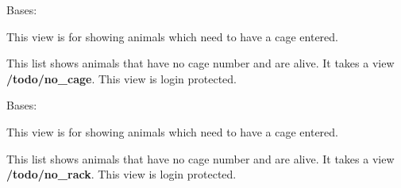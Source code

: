 \documentclass[letterpaper,10pt,english]{sphinxmanual}
\begin{document}
\begin{fulllineitems}
\label{api:mousedb.animal.views.NoCageList}
Bases: {\hyperref[api:mousedb.animal.views.AnimalList]{}}

This view is for showing animals which need to have a cage entered.

This list shows animals that have no cage number and are alive.
It takes a view \textbf{/todo/no\_cage}.
This view is login protected.

\begin{fulllineitems}
\label{api:mousedb.animal.views.NoCageList.queryset}
\end{fulllineitems}


\end{fulllineitems}


\begin{fulllineitems}
\label{api:mousedb.animal.views.NoRackList}
Bases: {\hyperref[api:mousedb.animal.views.AnimalList]{}}

This view is for showing animals which need to have a cage entered.

This list shows animals that have no cage number and are alive.
It takes a view \textbf{/todo/no\_rack}.
This view is login protected.

\begin{fulllineitems}
\label{api:mousedb.animal.views.NoRackList.queryset}
\end{fulllineitems}


\end{fulllineitems}

\end{document}
